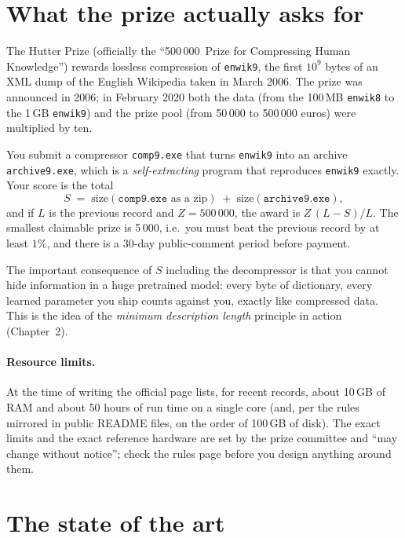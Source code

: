 \documentclass[11pt,a4paper,openany]{book}
\newcommand{\code}[1]{\texttt{#1}}
\theoremstyle{definition}
\theoremstyle{remark}
\begin{document}
\section{What the prize actually asks for}

The Hutter Prize (officially the ``500\,000\,\texteuro{} Prize for Compressing Human Knowledge'') rewards lossless compression of \code{enwik9}, the first $10^9$ bytes of an XML dump of the English Wikipedia taken in March 2006. The prize was announced in 2006; in February 2020 both the data (from the 100\,MB \code{enwik8} to the 1\,GB \code{enwik9}) and the prize pool (from 50\,000 to 500\,000 euros) were multiplied by ten.

\begin{keyidea}
You submit a compressor \code{comp9.exe} that turns \code{enwik9} into an archive \code{archive9.exe}, which is a \emph{self-extracting} program that reproduces \code{enwik9} exactly. Your score is the total
\[
S \;=\; \text{size}(\code{comp9.exe}\text{ as a zip}) \;+\; \text{size}(\code{archive9.exe}),
\]
and if $L$ is the previous record and $Z=500\,000$\texteuro{}, the award is $Z\,(L-S)/L$. The smallest claimable prize is 5\,000\texteuro, i.e.\ you must beat the previous record by at least $1\%$, and there is a 30-day public-comment period before payment.
\end{keyidea}

The important consequence of $S$ including the decompressor is that you cannot hide information in a huge pretrained model: every byte of dictionary, every learned parameter you ship counts against you, exactly like compressed data. This is the idea of the \emph{minimum description length} principle in action (Chapter~2).

\paragraph{Resource limits.} At the time of writing the official page lists, for recent records, about 10\,GB of RAM and about 50 hours of run time on a single core (and, per the rules mirrored in public README files, on the order of 100\,GB of disk). The exact limits and the exact reference hardware are set by the prize committee and ``may change without notice''; check the rules page before you design anything around them.

\section{The state of the art}
\end{document}
